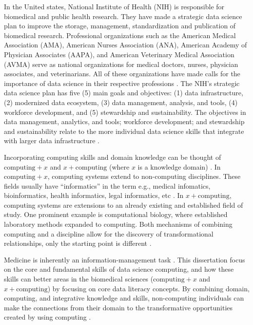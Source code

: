 \documentclass[010-intro.tex]{subfiles}
\begin{document}
In the United states,
National Institute of Health (NIH) is responsible for biomedical and public health research.
They have made a strategic data science plan to improve the
storage, management, standardization and publication of biomedical research.
Professional organizations such as the
American Medical Association (AMA),
American Nurses Association (ANA),
American Academy of Physician Associates (AAPA), and
American Veterinary Medical Association (AVMA)
serve as national organizations for medical doctors, nurses, physician associates, and veterinarians.
All of these organizations have made calls for the importance of data science in their respective professions
\cite{payneBiomedicalInformaticsMeets2018, americanmedicalassociationAcceleratingChangeMedical2021, americannursesassociationANAEnterpriseAmerican, owenEthicalIntersectionHealthcare2017, nolenArtificialIntelligenceVeterinary2020, nationalinstitutesofhealthNIHStrategicPlan2020}.
The NIH's strategic data science plan has five (5) main goals and objectives:
(1) data infrastructure,
(2) modernized data ecosystem,
(3) data management, analysis, and tools,
(4) workforce development, and
(5) stewardship and sustainability. %
The objectives in
data management, analytics, and tools;
workforce development;
and stewardship and sustainability
relate to the more individual data science skills that integrate with larger data infrastructure
\cite{nationalinstitutesofhealthNIHStrategicPlan2020}.

Incorporating computing skills and domain knowledge can be thought of
$\text{computing} + x$ and $x + \text{computing}$ (where $x$ is a knowledge domain)
\cite{cc2020}.
In $\text{computing} + x$, computing systems extend to non-computing disciplines.
These fields usually have ``informatics'' in the term
e.g., medical infomatics, bioinformatics, health informatics, legal informatics, etc \cite{CC2020}.
In $x + \text{computing}$,
computing systems are extensions to an already existing and established field of study.
One prominent example is computational biology,
where established laboratory methods expanded to computing.
Both mechanisms of combining computing and a discipline allow for the discovery of transformational relationships,
only the starting point is different \cite{cc2020}.

Medicine is inherently an information-management task
\cite{shortliffe1993adolescence}.
This dissertation focus on the core and fundamental skills
of data science computing, and how these skills can better areas in the biomedical sciences
($\text{computing} + x$ and $x + \text{computing}$)
by focusing on core data literacy concepts.
By combining domain, computing, and integrative knowledge and skills,
non-computing individuals can make the connections from their domain to the transformative opportunities
created by using computing \cite{cc2020}.
\end{document}
